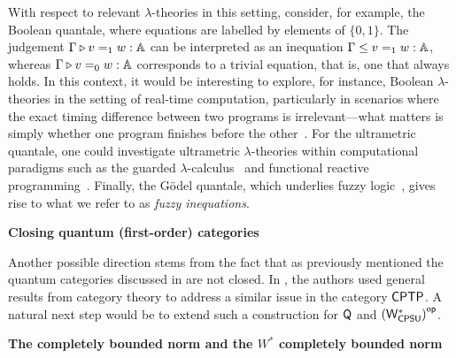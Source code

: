 With respect to relevant $\lambda$-theories in this setting, consider, for example, the Boolean quantale, where equations are labelled by elements of $\{0,1\}$. The judgement $\Gamma \triangleright v =_{1} w : \mathbb{A}$ can be interpreted as an inequation $\Gamma \leq v =_{1} w : \mathbb{A}$, whereas $\Gamma \triangleright v =_{0} w : \mathbb{A}$ corresponds to a trivial equation, that is, one that always holds.  In this context, it would be interesting to explore, for instance, Boolean $\lambda$-theories in the setting of real-time computation, particularly in scenarios where the exact timing difference between two programs is irrelevant---what matters is simply whether one program finishes before the other~\cite{dahlqvist2023syntactic}. For the ultrametric quantale, one could investigate ultrametric $\lambda$-theories within computational paradigms such as the guarded $\lambda$-calculus~\cite{guarded_ultrametric} and functional reactive programming~\cite{Ultrametric_reactive}. Finally, the Gödel quantale, which underlies fuzzy logic~\cite{deneckeGaloisConnectionsApplications2004}, gives rise to what we refer to as \emph{fuzzy inequations}.








\textbf{Closing quantum (first-order) categories}

Another possible direction stems from the fact that as previously mentioned the quantum categories discussed in  are not closed. In \cite{dahlqvist2023syntactic}, the authors used general results from category theory to address a similar issue in the category $\mathsf{CPTP}$. A natural next step would be to extend such a construction for $\mathsf{Q}$ and $\left(\mathsf{W^*_{CPSU}}\right)^{\mathsf{op}}$.


\textbf{The completely bounded norm and the $W^*$ completely bounded norm}

